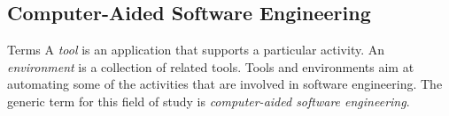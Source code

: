 		
		

\subsection{Computer-Aided Software Engineering}
\begin{frame}{\insertsubsection}
	\begin{fancycolumns}[widths={55}]
		\begin{definition}{Terms }
			A \emph{tool} is an application that supports a particular activity. An \emph{environment} is a collection of related tools. Tools and environments aim at automating some of the activities that are involved in software engineering. The generic term for this field of study is \emph{computer-aided software engineering}.
		\end{definition}
	\end{fancycolumns}
\end{frame}


